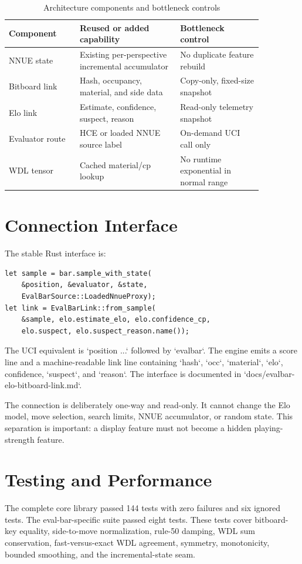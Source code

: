 \documentclass[10pt,conference]{IEEEtran}
\begin{document}
\begin{table}[t]
\centering
\caption{Architecture components and bottleneck controls}
\label{tab:architecture}
\begin{tabular}{p{0.24\linewidth}p{0.34\linewidth}p{0.28\linewidth}}
\toprule
Component & Reused or added capability & Bottleneck control\\
\midrule
NNUE state & Existing per-perspective incremental accumulator & No duplicate feature rebuild\\
Bitboard link & Hash, occupancy, material, and side data & Copy-only, fixed-size snapshot\\
Elo link & Estimate, confidence, suspect, reason & Read-only telemetry snapshot\\
Evaluator route & HCE or loaded NNUE source label & On-demand UCI call only\\
WDL tensor & Cached material/cp lookup & No runtime exponential in normal range\\
\bottomrule
\end{tabular}
\end{table}

\section{Connection Interface}
The stable Rust interface is:
\begin{verbatim}
let sample = bar.sample_with_state(
    &position, &evaluator, &state,
    EvalBarSource::LoadedNnueProxy);
let link = EvalBarLink::from_sample(
    &sample, elo.estimate_elo, elo.confidence_cp,
    elo.suspect, elo.suspect_reason.name());
\end{verbatim}
The UCI equivalent is `position ...` followed by `evalbar`. The engine emits a score line and a machine-readable link line containing `hash`, `occ`, `material`, `elo`, confidence, `suspect`, and `reason`. The interface is documented in `docs/evalbar-elo-bitboard-link.md`.

The connection is deliberately one-way and read-only. It cannot change the Elo model, move selection, search limits, NNUE accumulator, or random state. This separation is important: a display feature must not become a hidden playing-strength feature.

\section{Testing and Performance}
The complete core library passed 144 tests with zero failures and six ignored tests. The eval-bar-specific suite passed eight tests. These tests cover bitboard-key equality, side-to-move normalization, rule-50 damping, WDL sum conservation, fast-versus-exact WDL agreement, symmetry, monotonicity, bounded smoothing, and the incremental-state seam.
\end{document}
